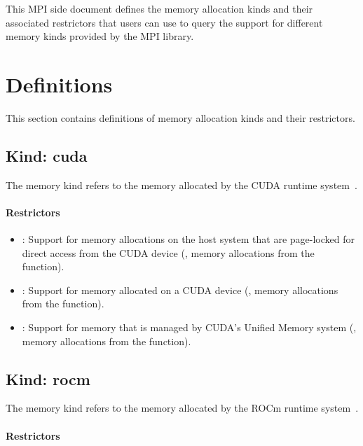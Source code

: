 This MPI side document defines the memory allocation kinds and their
associated restrictors that users can use to query the support for
different memory kinds provided by the MPI library.

\chapter{Definitions}

This section contains definitions of memory allocation kinds and
their restrictors.

\section{Kind: cuda}

The  memory kind refers to the memory allocated by the
CUDA runtime system~\cite{cudaref}.

\subsubsection{Restrictors}

\begin{itemize}

\item {}: Support for memory allocations on the host system
    that are page-locked for direct access from the CUDA device (\eg,
        memory allocations from the  function).

\item {}: Support for memory allocated on a CUDA device
    (\eg, memory allocations from the  function).

\item {}: Support for memory that is managed by CUDA’s
    Unified Memory system (\eg, memory allocations from the
         function).

\end{itemize}

\section{Kind: rocm}

The  memory kind refers to the memory allocated by the ROCm
runtime system~\cite{rocmref}.

\subsubsection{Restrictors}

